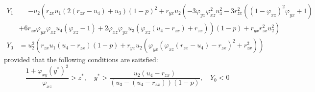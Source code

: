 \begin{theorem}
\begin{align*}
        Y_1 &= -u_2\left(r_{zx}u_1\left(2\left(r_{zx}-u_4\right)+u_3\right)\left(1-p\right)^2+r_{yx}u_2\left(-3\varphi_{yx}\varphi_{xz}^2u_4^2-3r_{zx}^2\left(\left(1-\varphi_{xz}\right)^2\varphi_{yx}+1\right)\right.\right.\\
        &\left.\left.+6r_{zx}\varphi_{yx}\varphi_{xz}u_4\left(\varphi_{xz}-1\right)+2\varphi_{xz}\varphi_{yx}u_3\left(\varphi_{xz}\left(u_4-r_{zx}\right)+r_{zx}\right)\right)\left(1-p\right)+r_{yx}r_{zx}^2u_2^2 \right)\\
        Y_0 &= u_2^2\left(r_{zx}u_1\left(u_4-r_{zx}\right)\left(1-p\right)+r_{yx}u_2\left(\varphi_{yx}\left(\varphi_{xz}\left(r_{zx}-u_4\right)-r_{zx}\right)^2+r_{zx}^2\right)\right)
    \end{align*}
    provided that the following conditions are saitsfied:
    \begin{equation*}
        \frac{1+\varphi_{xy}\left(y^*\right)^2}{\varphi_{xz}}>z^*,\quad
        y^*>\frac{u_2\left(u_4-r_{zx}\right)}{\left(u_3-\left(u_4-r_{zx}\right)\right)\left(1-p\right)},\quad
        Y_0 < 0
    \end{equation*}
\end{theorem}
